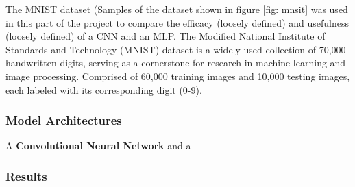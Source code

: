 The MNIST dataset (Samples of the dataset shown in figure \ref*{fig: mnsit}
was used in this part of the project to compare the efficacy (loosely defined)
and usefulness (loosely defined) of a CNN and an MLP. The Modified National Institute 
of Standards and Technology (MNIST) dataset is a widely used collection of 
70,000 handwritten digits, serving as a cornerstone for research in machine 
learning and image processing. Comprised of 60,000 training images and 10,000 
testing images, each labeled with its corresponding digit (0-9). 

\subsubsection{Model Architectures}

A \textbf{Convolutional Neural Network} and a 


\subsubsection{Results}

